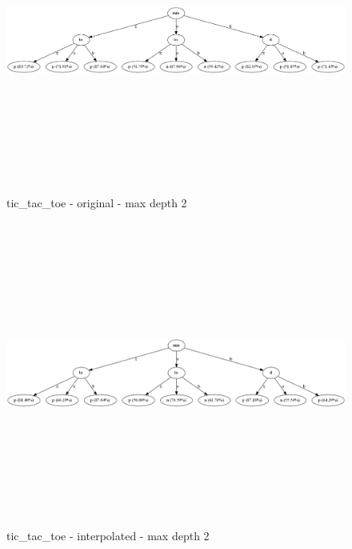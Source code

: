 \documentclass{sig-alternate}
\begin{document}
\afterpage{\clearpage}
\begin{figure}[!t]
    \centering
    \includegraphics[width=1.00\textwidth,height=10cm,keepaspectratio]{./images/ticTacToeD2Original.png}
    \caption{tic\_tac\_toe - original - max depth 2}
    \label{figure:ticTacToeD2Original}
\end{figure}
\begin{figure}[h]
    \centering
    \includegraphics[width=1.00\textwidth,height=10cm,keepaspectratio]{./images/ticTacToeD2New.png}
    \caption{tic\_tac\_toe - interpolated - max depth 2}
    \label{figure:ticTacToeD2New}
\end{figure}
\end{document}
